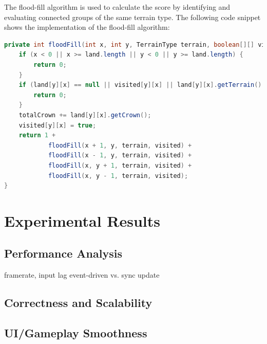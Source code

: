\documentclass[conference]{IEEEtran}
\begin{document}
The flood-fill algorithm is used to calculate the score by identifying and evaluating connected groups of the same terrain type. The following code snippet shows the implementation of the flood-fill algorithm:

\begin{lstlisting}[language=Java, caption={Flood-Fill Algorithm}, label={lst:floodfill}]
private int floodFill(int x, int y, TerrainType terrain, boolean[][] visited) {
    if (x < 0 || x >= land.length || y < 0 || y >= land.length) {
        return 0;
    }
    if (land[y][x] == null || visited[y][x] || land[y][x].getTerrain() != terrain) {
        return 0;
    }
    totalCrown += land[y][x].getCrown();
    visited[y][x] = true;
    return 1 +
            floodFill(x + 1, y, terrain, visited) +
            floodFill(x - 1, y, terrain, visited) +
            floodFill(x, y + 1, terrain, visited) +
            floodFill(x, y - 1, terrain, visited);
}
\end{lstlisting}

\section{Experimental Results}

\subsection{Performance Analysis}
framerate, input lag event-driven vs. sync update

\subsection{Correctness and Scalability}

\subsection{UI/Gameplay Smoothness}

\end{document}
